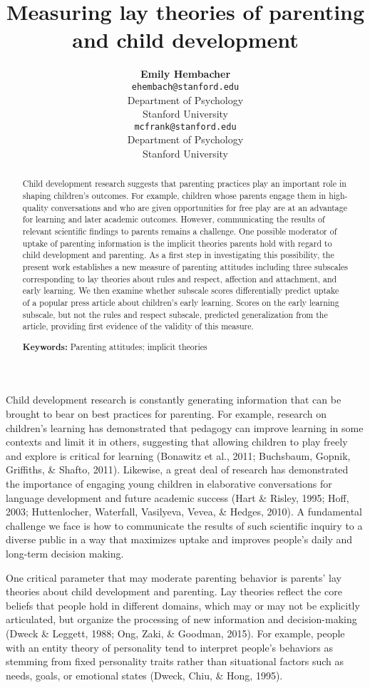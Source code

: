 \documentclass[10pt, letterpaper]{article}
\title{Measuring lay theories of parenting and child development}
\author{{\large \bf Emily Hembacher} \\ \texttt{ehembach@stanford.edu} \\ Department of Psychology \\ Stanford University \And {\large \bf Michael C. Frank} \\ \texttt{mcfrank@stanford.edu} \\ Department of Psychology \\ Stanford University}
\begin{document}
\maketitle

\begin{abstract}
Child development research suggests that parenting practices play an
important role in shaping children's outcomes. For example, children
whose parents engage them in high-quality conversations and who are
given opportunities for free play are at an advantage for learning and
later academic outcomes. However, communicating the results of relevant
scientific findings to parents remains a challenge. One possible
moderator of uptake of parenting information is the implicit theories
parents hold with regard to child development and parenting. As a first
step in investigating this possibility, the present work establishes a
new measure of parenting attitudes including three subscales
corresponding to lay theories about rules and respect, affection and
attachment, and early learning. We then examine whether subscale scores
differentially predict uptake of a popular press article about
children's early learning. Scores on the early learning subscale, but
not the rules and respect subscale, predicted generalization from the
article, providing first evidence of the validity of this measure.

\textbf{Keywords:}
Parenting attitudes; implicit theories
\end{abstract}

Child development research is constantly generating information that can
be brought to bear on best practices for parenting. For example,
research on children's learning has demonstrated that pedagogy can
improve learning in some contexts and limit it in others, suggesting
that allowing children to play freely and explore is critical for
learning (Bonawitz et al., 2011; Buchsbaum, Gopnik, Griffiths, \&
Shafto, 2011). Likewise, a great deal of research has demonstrated the
importance of engaging young children in elaborative conversations for
language development and future academic success (Hart \& Risley, 1995;
Hoff, 2003; Huttenlocher, Waterfall, Vasilyeva, Vevea, \& Hedges, 2010).
A fundamental challenge we face is how to communicate the results of
such scientific inquiry to a diverse public in a way that maximizes
uptake and improves people's daily and long-term decision making.

One critical parameter that may moderate parenting behavior is parents'
lay theories about child development and parenting. Lay theories reflect
the core beliefs that people hold in different domains, which may or may
not be explicitly articulated, but organize the processing of new
information and decision-making (Dweck \& Leggett, 1988; Ong, Zaki, \&
Goodman, 2015). For example, people with an entity theory of personality
tend to interpret people's behaviors as stemming from fixed personality
traits rather than situational factors such as needs, goals, or
emotional states (Dweck, Chiu, \& Hong, 1995).
\end{document}
